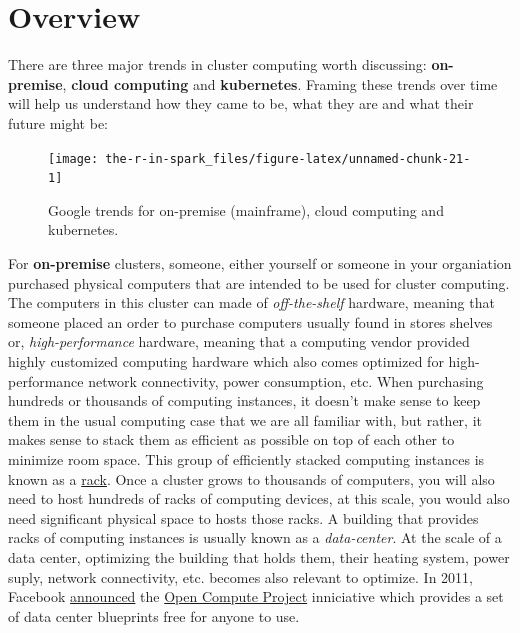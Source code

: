 \documentclass[]{book}
\theoremstyle{definition}
\theoremstyle{definition}
\theoremstyle{definition}
\theoremstyle{remark}
\begin{document}
\hypertarget{overview-1}{%
\section{Overview}\label{overview-1}}

There are three major trends in cluster computing worth discussing:
\textbf{on-premise}, \textbf{cloud computing} and \textbf{kubernetes}.
Framing these trends over time will help us understand how they came to
be, what they are and what their future might be:

\begin{figure}

{\centering \texttt{[image: the-r-in-spark\_files/figure-latex/unnamed-chunk-21-1]} 

}

\caption{Google trends for on-premise (mainframe), cloud computing and kubernetes.}\label{fig:unnamed-chunk-21}
\end{figure}

For \textbf{on-premise} clusters, someone, either yourself or someone in
your organiation purchased physical computers that are intended to be
used for cluster computing. The computers in this cluster can made of
\emph{off-the-shelf} hardware, meaning that someone placed an order to
purchase computers usually found in stores shelves or,
\emph{high-performance} hardware, meaning that a computing vendor
provided highly customized computing hardware which also comes optimized
for high-performance network connectivity, power consumption, etc. When
purchasing hundreds or thousands of computing instances, it doesn't make
sense to keep them in the usual computing case that we are all familiar
with, but rather, it makes sense to stack them as efficient as possible
on top of each other to minimize room space. This group of efficiently
stacked computing instances is known as a
\href{https://en.wikipedia.org/wiki/Rack_unit}{rack}. Once a cluster
grows to thousands of computers, you will also need to host hundreds of
racks of computing devices, at this scale, you would also need
significant physical space to hosts those racks. A building that
provides racks of computing instances is usually known as a
\emph{data-center}. At the scale of a data center, optimizing the
building that holds them, their heating system, power suply, network
connectivity, etc. becomes also relevant to optimize. In 2011, Facebook
\href{https://code.facebook.com/posts/187637061409082/building-efficient-data-centers-with-the-open-compute-project/}{announced}
the \href{http://www.opencompute.org/}{Open Compute Project} inniciative
which provides a set of data center blueprints free for anyone to use.
\end{document}
